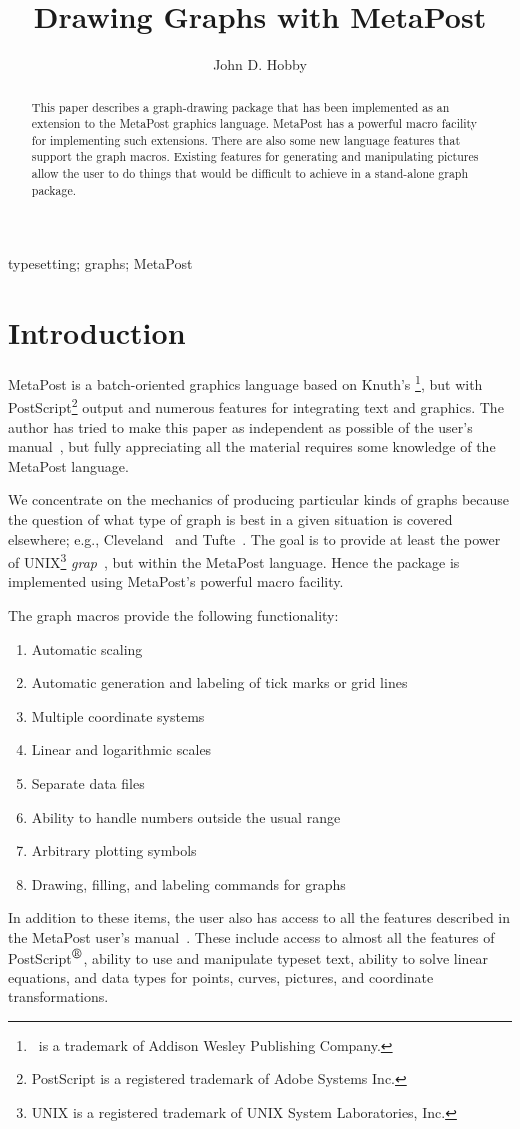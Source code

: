 \documentclass{article} %
\author{John D. Hobby}
\title{Drawing Graphs with {MetaPost}}
\date{}
\newcommand*{\regmark}{$^{\mbox{\textregistered}}$}%
\newcommand\myabstract{%
This paper describes a graph-drawing package that has been implemented
as an extension to the MetaPost graphics language.  MetaPost has
a powerful macro facility for implementing such extensions.  There are
also some new language features that support the graph macros.
Existing features for generating and manipulating pictures
allow the user to do things that would be difficult to achieve
in a stand-alone graph package.}
\newcommand\mykeywords{%
    typesetting; graphs; MetaPost}
\begin{document}
  \maketitle
  \begin{abstract} \myabstract \end{abstract}
  \ifx\keywords\undefined \else
    \begin{keywords} \mykeywords \end{keywords}
  \fi

\setlength{\columnsep}{2.5em}
\begin{multicols}{2}
\tableofcontents
\end{multicols}

\section{Introduction}
\label{intro}

MetaPost is a batch-oriented graphics language based on Knuth's \MF\footnote{\MF\
is a trademark of Addison Wesley Publishing Company.}, but with
PostScript\footnote{PostScript is a registered trademark of Adobe Systems Inc.}
output and numerous features for integrating text and graphics.
The author has tried to make this paper as independent as possible of the
user's manual~\cite{ho:mp3}, but fully appreciating all the material requires
some knowledge of the MetaPost language.

We concentrate on the mechanics of producing particular kinds of graphs
because the question of what type of graph is best in a given situation
is covered elsewhere; e.g., Cleveland~\cite{Cleve85,Cleve93,Cleve93a} and
Tufte~\cite{Tufte83}.
The goal is to provide at least the power of UNIX\footnote{UNIX is a registered
trademark of UNIX System Laboratories, Inc.} {\it
grap\/}~\cite{BenKer90}, but within the MetaPost language.
Hence the package is implemented using MetaPost's powerful macro facility.

The graph macros provide the following functionality:
\begin{enumerate}
\item Automatic scaling
\item Automatic generation and labeling of tick marks or grid lines
\item Multiple coordinate systems
\item Linear and logarithmic scales
\item Separate data files
\item Ability to handle numbers outside the usual range
\item Arbitrary plotting symbols
\item Drawing, filling, and labeling commands for graphs
\end{enumerate}
In addition to these items, the user also has access to all the features
described in the MetaPost user's manual~\cite{ho:mp3}.
These include access to almost all the features of PostScript\regmark,
ability to use and manipulate typeset text,
ability to solve linear equations,
and data types for points, curves, pictures, and coordinate transformations.
\end{document}
